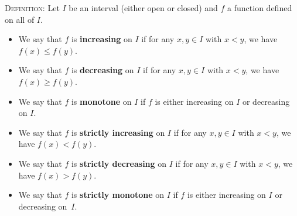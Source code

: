 \documentclass[12pt]{amsart}
\numberwithin{equation}{section}
\theoremstyle{plain} %
\theoremstyle{definition}
\theoremstyle{remark}
\begin{document}
\begin{framed}
\noindent \textsc{Definition:} Let $I$ be an interval (either open or closed) and $f$ a function defined on all of $I$. 
\begin{itemize}
\item We say that $f$ is \textbf{increasing} on $I$ if for any $x,y\in I$ with $x<y$, we have $f(x) \leq f(y)$. 
\item We say that $f$ is \textbf{decreasing} on $I$ if for any $x,y\in I$ with $x<y$, we have $f(x) \geq f(y)$.
\item We say that $f$ is \textbf{monotone} on $I$ if $f$ is either increasing on $I$ or decreasing on $I$.
\item We say that $f$ is \textbf{strictly increasing} on $I$ if for any $x,y\in I$ with $x<y$, we have $f(x)< f(y)$. 
\item We say that $f$ is \textbf{strictly decreasing} on $I$ if for any $x,y\in I$ with $x<y$, we have $f(x) > f(y)$.
\item We say that $f$ is \textbf{strictly monotone} on $I$ if $f$ is either increasing on $I$ or decreasing on~$I$.
\end{itemize}

\end{framed}
\end{document}
